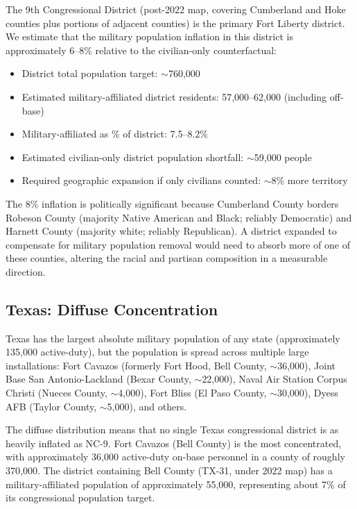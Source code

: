 The 9th Congressional District (post-2022 map, covering Cumberland and Hoke counties plus portions of adjacent counties) is the primary Fort Liberty district. We estimate that the military population inflation in this district is approximately 6--8\% relative to the civilian-only counterfactual:

\begin{itemize}
    \item District total population target: $\sim$760,000
    \item Estimated military-affiliated district residents: 57,000--62,000 (including off-base)
    \item Military-affiliated as \% of district: 7.5--8.2\%
    \item Estimated civilian-only district population shortfall: $\sim$59,000 people
    \item Required geographic expansion if only civilians counted: $\sim$8\% more territory
\end{itemize}

The 8\% inflation is politically significant because Cumberland County borders Robeson County (majority Native American and Black; reliably Democratic) and Harnett County (majority white; reliably Republican). A district expanded to compensate for military population removal would need to absorb more of one of these counties, altering the racial and partisan composition in a measurable direction.

\subsection{Texas: Diffuse Concentration}

Texas has the largest absolute military population of any state (approximately 135,000 active-duty), but the population is spread across multiple large installations: Fort Cavazos (formerly Fort Hood, Bell County, $\sim$36,000), Joint Base San Antonio-Lackland (Bexar County, $\sim$22,000), Naval Air Station Corpus Christi (Nueces County, $\sim$4,000), Fort Bliss (El Paso County, $\sim$30,000), Dyess AFB (Taylor County, $\sim$5,000), and others.

The diffuse distribution means that no single Texas congressional district is as heavily inflated as NC-9. Fort Cavazos (Bell County) is the most concentrated, with approximately 36,000 active-duty on-base personnel in a county of roughly 370,000. The district containing Bell County (TX-31, under 2022 map) has a military-affiliated population of approximately 55,000, representing about 7\% of its congressional population target.

